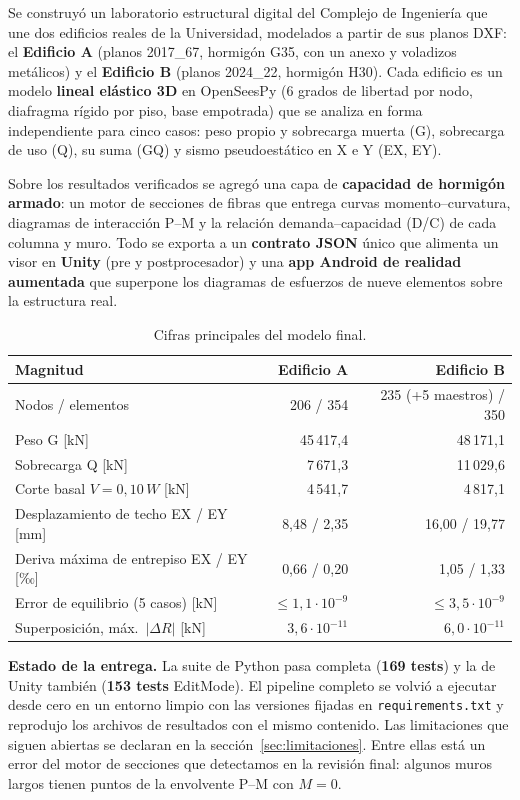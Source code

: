 \documentclass[11pt,a4paper]{article}
\begin{document}
Se construyó un laboratorio estructural digital del Complejo de Ingeniería que
une dos edificios reales de la Universidad, modelados a partir de sus planos
DXF: el \textbf{Edificio A} (planos 2017\_67, hormigón G35, con un anexo y
voladizos metálicos) y el \textbf{Edificio B} (planos 2024\_22, hormigón H30).
Cada edificio es un modelo \textbf{lineal elástico 3D} en OpenSeesPy (6 grados de
libertad por nodo, diafragma rígido por piso, base empotrada) que se analiza en
forma independiente para cinco casos: peso propio y sobrecarga muerta (G),
sobrecarga de uso (Q), su suma (GQ) y sismo pseudoestático en X e Y (EX, EY).

Sobre los resultados verificados se agregó una capa de \textbf{capacidad de
hormigón armado}: un motor de secciones de fibras que entrega curvas
momento--curvatura, diagramas de interacción P--M y la relación
demanda--capacidad (D/C) de cada columna y muro. Todo se exporta a un
\textbf{contrato JSON} único que alimenta un visor en \textbf{Unity} (pre y
postprocesador) y una \textbf{app Android de realidad aumentada} que superpone
los diagramas de esfuerzos de nueve elementos sobre la estructura real.

\begin{table}[h]
\centering
\caption{Cifras principales del modelo final.}
\begin{tabular}{lrr}
\toprule
Magnitud & Edificio A & Edificio B \\
\midrule
Nodos / elementos & 206 / 354 & 235 (+5 maestros) / 350 \\
Peso G [kN] & 45\,417,4 & 48\,171,1 \\
Sobrecarga Q [kN] & 7\,671,3 & 11\,029,6 \\
Corte basal $V = 0{,}10\,W$ [kN] & 4\,541,7 & 4\,817,1 \\
Desplazamiento de techo EX / EY [mm] & 8,48 / 2,35 & 16,00 / 19,77 \\
Deriva máxima de entrepiso EX / EY [‰] & 0,66 / 0,20 & 1,05 / 1,33 \\
Error de equilibrio (5 casos) [kN] & $\le 1{,}1\cdot10^{-9}$ & $\le 3{,}5\cdot10^{-9}$ \\
Superposición, máx.\ $|\Delta R|$ [kN] & $3{,}6\cdot10^{-11}$ & $6{,}0\cdot10^{-11}$ \\
\bottomrule
\end{tabular}
\end{table}

\textbf{Estado de la entrega.} La suite de Python pasa completa
(\textbf{169 tests}) y la de Unity también (\textbf{153 tests} EditMode). El
pipeline completo se volvió a ejecutar desde cero en un entorno limpio con las
versiones fijadas en \texttt{requirements.txt} y reprodujo los archivos de
resultados con el mismo contenido. Las limitaciones que siguen abiertas se declaran
en la sección~\ref{sec:limitaciones}. Entre ellas está un error del motor de
secciones que detectamos en la revisión final: algunos muros largos tienen
puntos de la envolvente P--M con $M = 0$.
\end{document}
